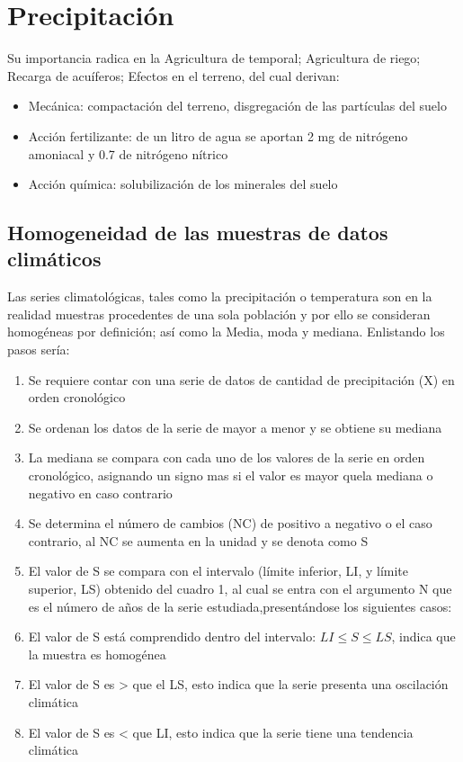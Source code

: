 \section{Precipitación}

Su importancia radica en la Agricultura de temporal; Agricultura de riego; Recarga de acuíferos; Efectos en el terreno, del cual derivan:
\begin{itemize}
    \item Mecánica: compactación del terreno, disgregación de las partículas del suelo
    \item Acción fertilizante: de un litro de agua se aportan 2 mg de nitrógeno amoniacal y 0.7 de nitrógeno nítrico
    \item Acción química: solubilización de los minerales del suelo
\end{itemize}

\subsection{Homogeneidad de las muestras de datos climáticos}

Las series climatológicas, tales como la precipitación o temperatura son en la realidad muestras procedentes de una sola población y por ello se consideran homogéneas por definición; así como la Media, moda y mediana. Enlistando los pasos sería:

\begin{enumerate}
    \item Se requiere contar con una serie de datos de cantidad de precipitación (X) en orden cronológico
    \item Se ordenan los datos de la serie de mayor a menor y se obtiene su mediana
    \item La mediana se compara con cada uno de los valores de la serie en orden cronológico, asignando un signo mas si el valor es mayor quela mediana o negativo en caso contrario
    \item Se determina el número de cambios (NC) de positivo a negativo o el caso contrario, al NC se aumenta en la unidad y se denota como S
    \item El valor de S se compara con el intervalo (límite inferior, LI, y límite superior, LS) obtenido del cuadro 1, al cual se entra con el argumento N que es el número de años de la serie estudiada,presentándose los siguientes casos:
    \item El valor de S está comprendido dentro del intervalo: $LI\leq S\leq LS$, indica que la muestra es homogénea
    \item El valor de S es > que el LS, esto indica que la serie presenta una oscilación climática
    \item El valor de S es < que LI, esto indica que la serie tiene una tendencia climática
\end{enumerate}

